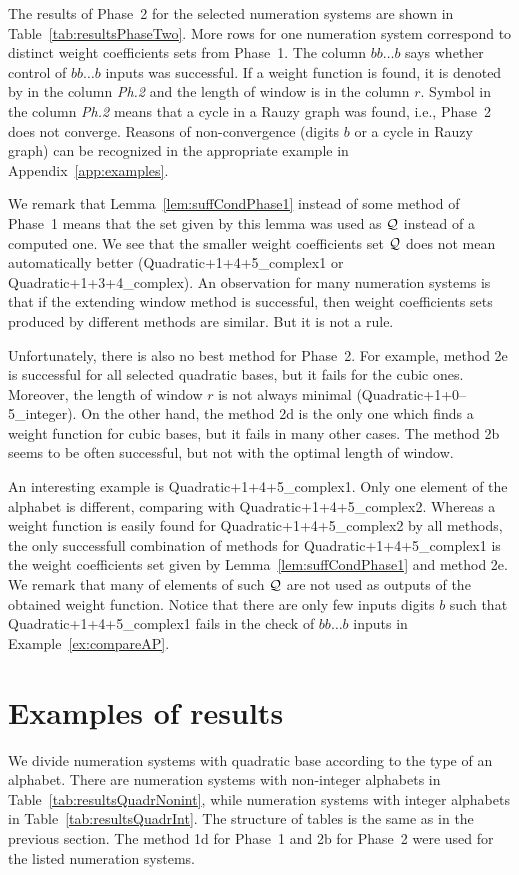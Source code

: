 The results of Phase~2 for the selected numeration systems are shown in Table~\ref{tab:resultsPhaseTwo}. More rows for one numeration system correspond to distinct weight coefficients sets from Phase~1. The column $bb\dots b$ says whether control of $bb\dots b$ inputs was successful. If a weight function is found, it is denoted by \checkmark{} in the column \emph{Ph.2} and the length of window is in the column $r$. Symbol \xmark{} in the column \emph{Ph.2} means that a cycle in a Rauzy graph was found, i.e., Phase~2 does not converge. Reasons of non-convergence (digits $b$ or a cycle in Rauzy graph) can be recognized in the appropriate example in Appendix~\ref{app:examples}.

We remark that Lemma~\ref{lem:suffCondPhase1} instead of some method of Phase~1 means that the set given by this lemma was used as $\mathcal{Q}$ instead of a computed one.  We see that the smaller weight coefficients set $\mathcal{Q}$ does not mean automatically better (Quadratic+1+4+5\_complex1 or Quadratic+1+3+4\_complex). An observation for many numeration systems is that if the extending window method is successful, then weight coefficients sets produced by different methods are similar. But it is not a rule. 

Unfortunately, there is also no best method for Phase~2. For example, method 2e is successful for all selected quadratic bases, but it fails for the cubic ones. Moreover, the length of window $r$ is not always minimal (Quadratic+1+0--5\_integer). On the other hand, the method 2d is the only one which finds a weight function for cubic bases, but it fails in many other cases. The method 2b seems to be often successful, but not with the optimal length of window.

An interesting example is Quadratic+1+4+5\_complex1. Only one element of the alphabet is different, comparing with Quadratic+1+4+5\_complex2. Whereas a weight function is easily found for Quadratic+1+4+5\_complex2 by all methods, the only successfull combination of methods for Quadratic+1+4+5\_complex1 is the weight coefficients set given by Lemma~\ref{lem:suffCondPhase1} and method 2e. We remark that many of elements of such $\mathcal{Q}$ are not used as outputs of the obtained weight function. Notice   that there are only few inputs digits $b$ such that  Quadratic+1+4+5\_complex1 fails in the check of $bb\dots b$ inputs in Example~\ref{ex:compareAP}.





\section{Examples of results}
\label{sec:resultsExamples}
We divide numeration systems with quadratic base according to the type of an alphabet. There are numeration systems with non-integer alphabets in Table~\ref{tab:resultsQuadrNonint}, while numeration systems with integer alphabets in Table~\ref{tab:resultsQuadrInt}. The structure of tables is the same as in the previous section. The method 1d for Phase~1 and 2b for Phase~2 were used for the listed numeration systems.

